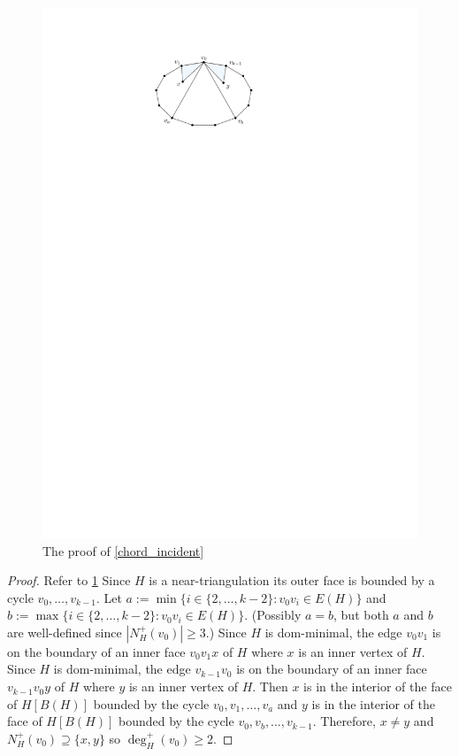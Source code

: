 \documentclass[12pt]{article}
\theoremstyle{definition}
\begin{document}
\begin{figure}[htbp]
  \begin{center}
    \includegraphics{figs/chord_incident}
  \end{center}
  \caption{The proof of \cref{chord_incident}}
  \label{chord_incident_fig}
\end{figure}
\begin{proof}
  Refer to \cref{chord_incident_fig}
  Since $H$ is a near-triangulation its outer face is bounded by a cycle $v_0,\ldots,v_{k-1}$.  Let $a:=\min\{i\in\{2,\ldots,k-2\}:v_0v_i\in E(H)\}$ and $b:=\max\{i\in\{2,\ldots,k-2\}:v_0v_i\in E(H)\}$. (Possibly $a=b$, but both $a$ and $b$ are well-defined since $|N^+_H(v_0)|\ge 3$.)   Since $H$ is dom-minimal, the edge $v_0v_1$ is on the boundary of an inner face $v_0v_1x$ of $H$ where $x$ is an inner vertex of $H$.  Since $H$ is dom-minimal, the edge $v_{k-1}v_0$ is on the boundary of an inner face $v_{k-1}v_0y$ of $H$ where $y$ is an inner vertex of $H$.  Then $x$ is in the interior of the face of $H[B(H)]$ bounded by the cycle $v_0,v_1,\ldots,v_a$ and $y$ is in the interior of the face of $H[B(H)]$ bounded by the cycle $v_0,v_b,\ldots,v_{k-1}$.  Therefore, $x\neq y$ and $N^+_H(v_0)\supseteq\{x,y\}$ so $\deg^+_H(v_0)\ge 2$.
\end{proof}
\end{document}

